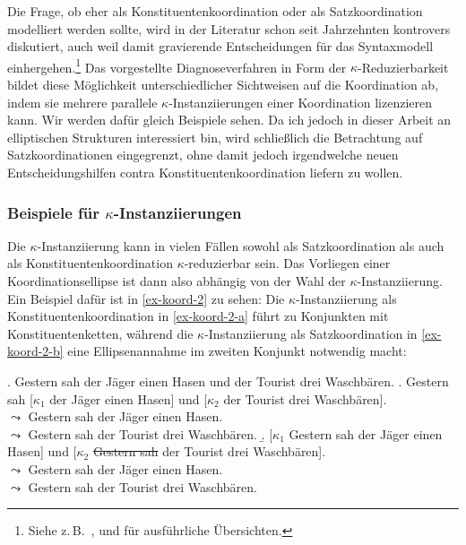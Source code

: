 Die Frage, ob  eher als Konstituentenkoordination oder als Satzkoordination modelliert werden sollte, wird in der Literatur schon seit Jahrzehnten kontrovers diskutiert, auch weil damit gravierende Entscheidungen für das Syntaxmodell einhergehen.\footnote{Siehe z.\,B.\  \citet[Chapter~1]{Oirsouw:87}, \citet[61ff]{Wilder:97} und \citet[32ff]{Hartmann:00} für ausführliche Übersichten.} Das vorgestellte Diagnoseverfahren in Form der $\kappa$-Reduzierbarkeit bildet diese Möglichkeit unterschiedlicher Sichtweisen auf die Koordination ab, indem sie mehrere parallele $\kappa$-Instanziierungen einer Koordination lizenzieren kann. Wir werden dafür gleich Beispiele sehen. Da ich jedoch in dieser Arbeit an elliptischen Strukturen interessiert bin, wird schlie\ss lich die Betrachtung auf Satzkoordinationen eingegrenzt, ohne damit jedoch irgendwelche neuen Entscheidungshilfen contra Konstituentenkoordination liefern zu wollen. 

\subsubsection*{Beispiele für $\kappa$-Instanziierungen}

Die $\kappa$-Instanziierung kann in vielen Fällen sowohl als Satzkoordination als auch als Konstituentenkoordination $\kappa$-reduzierbar sein. Das Vorliegen einer Koordinationsellipse ist dann also abhängig von der Wahl der $\kappa$-Instanziierung. Ein Beispiel dafür ist in \ref{ex-koord-2} zu sehen: Die $\kappa$-Instanziierung als Konstituentenkoordination in \ref{ex-koord-2-a} führt zu Konjunkten mit Konstituentenketten, während die $\kappa$-Instanziierung als Satzkoordination in \ref{ex-koord-2-b} eine Ellipsenannahme im zweiten Konjunkt notwendig macht: 

\ex. Gestern sah der Jäger einen Hasen und der Tourist drei Waschbären. \label{ex-koord-2}
\a. \label{ex-koord-2-a} Gestern sah [$\kappa_1$ der Jäger einen Hasen] und [$\kappa_2$ der Tourist drei Waschbären]. \\
$\leadsto$ Gestern sah der Jäger einen Hasen. \\
$\leadsto$ Gestern sah der Tourist drei Waschbären. 
\b. \label{ex-koord-2-b} [$\kappa_1$ Gestern sah der Jäger einen Hasen] und [$\kappa_2$ \sout{Gestern sah} der Tourist drei Waschbären]. \\
$\leadsto$ Gestern sah der Jäger einen Hasen. \\
$\leadsto$ Gestern sah der Tourist drei Waschbären. 

